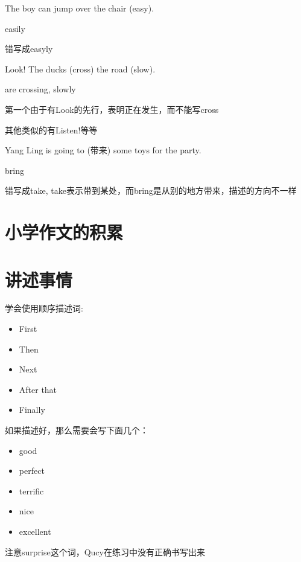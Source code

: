 \begin{question}[tags={xiaoxuect}]
The boy can jump over the chair \blank[width=1.4cm]{}(easy).
\end{question}
\begin{solution}
easily

错写成easyly
\end{solution}

\begin{question}[tags={xiaoxuect}]
Look! The ducks \blank[width=1.4cm]{}(cross) the road \blank[width=1cm]{}(slow).
\end{question}
\begin{solution}
are crossing, slowly

第一个由于有Look的先行，表明正在发生，而不能写cross

其他类似的有Listen!等等
\end{solution}


\begin{question}[tags={xiaoxuect}]
Yang Ling is going to \blank[width=1.4cm]{}(带来) some toys for the party.
\end{question}
\begin{solution}
bring

错写成take, take表示带到某处，而bring是从别的地方带来，描述的方向不一样
\end{solution}

\section{小学作文的积累}

  \section{讲述事情}
学会使用顺序描述词:

\begin{itemize}
    \item First
    \item Then
    \item Next
    \item After that
    \item Finally
\end{itemize}

如果描述好，那么需要会写下面几个：

\begin{itemize}
    \item good
    \item perfect
    \item terrific
    \item nice
    \item excellent
\end{itemize}

注意surprise这个词，Qucy在练习中没有正确书写出来